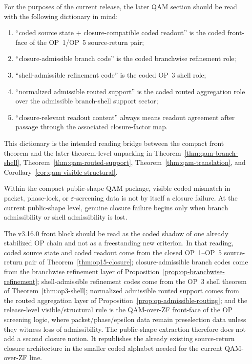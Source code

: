 \begin{remark}\label{rem:public-shape-reading-guide}
For the purposes of the current release, the later QAM section should be read with the following dictionary in mind:
\begin{enumerate}[leftmargin=2em]
  \item ``coded source state + closure-compatible coded readout'' is the coded front-face of the OP~1/OP~5 source-return pair;
  \item ``closure-admissible branch code'' is the coded branchwise refinement role;
  \item ``shell-admissible refinement code'' is the coded OP~3 shell role;
  \item ``normalized admissible routed support'' is the coded routed aggregation role over the admissible branch-shell support sector;
  \item ``closure-relevant readout content'' always means readout agreement after passage through the associated closure-factor map.
\end{enumerate}
This dictionary is the intended reading bridge between the compact front theorem and the later theorem-level unpacking in Theorem~\ref{thm:qam-branch-shell}, Theorem~\ref{thm:qam-routed-support}, Theorem~\ref{thm:qam-translation}, and Corollary~\ref{cor:qam-visible-structural}.
\end{remark}

\begin{corollary}\label{cor:release-visible-structural-rule}
Within the compact public-shape QAM package, visible coded mismatch in packet, phase-lock, or $\varepsilon$-screening data is not by itself a closure failure. At the current public-shape level, genuine closure failure begins only when branch admissibility or shell admissibility is lost.
\end{corollary}

\begin{remark}
The v3.16.0 front block should be read as the coded shadow of one already stabilized OP chain and not as a freestanding new criterion. In that reading, coded source state and coded readout come from the closed OP~1--OP~5 source-return pair of Theorem~\ref{thm:op15-closure}; closure-admissible branch codes come from the branchwise refinement layer of Proposition~\ref{prop:op-branchwise-refinement}; shell-admissible refinement codes come from the OP~3 shell theorem of Theorem~\ref{thm:op3-shell}; normalized admissible routed support comes from the routed aggregation layer of Proposition~\ref{prop:op-admissible-routing}; and the release-level visible/structural rule is the QAM-over-ZF front-face of the OP screening logic, where packet/phase/epsilon data remain preselection data unless they witness loss of admissibility. The public-shape extraction therefore does not add a second closure notion. It republishes the already existing source-return closure architecture in the smaller coded alphabet needed for the current QAM-over-ZF line.
\end{remark}

